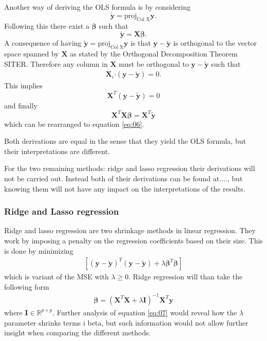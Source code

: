 \documentclass[uio,jmp,amsmath,amssymb,reprint]{revtex4-1}
\numberwithin{equation}{section}
\newcommand{\lp}{\left(}
\newcommand{\rp}{\right)}
\newcommand{\lsb}{\left[}
\newcommand{\rsb}{\right]}
\newcommand{\pdot}{\boldsymbol{\cdot}}
\begin{document}
Another way of deriving the OLS formula is by considering
\begin{equation}
    \bm{\tilde{y}} = \text{proj}_{\text{Col X}}\bm{y}.
\end{equation}
Following this there exist a \(\bm{\beta}\) such that
\begin{equation}
    \bm{\tilde{y}} = \bm{X}\bm{\beta}.
\end{equation}
A consequence of having \(\bm{\tilde{y}} = \text{proj}_{\text{Col X}}\bm{y}\) is that \(\bm{y} - \bm{\tilde{y}}\) is orthogonal to the vector space spanned by \(\bm{X}\) as stated by the Orthogonal Decomposition Theorem SITER. Therefore any column in \(\bm{X}\) must be orthogonal to \(\bm{y} - \bm{\tilde{y}}\) such that
\begin{align}
    \bm{X}_i\pdot (\bm{y} - \bm{\tilde{y}}) = 0.
\end{align}
This implies
\begin{equation}
    \bm{X}^T(\bm{y} - \bm{\tilde{y}}) = 0
\end{equation}
and finally
\begin{equation}
    \bm{X}^T\bm{X}\bm{\beta} = \bm{X}^T\bm{\tilde{y}} 
\end{equation}
which can be rearranged to equation \ref{eq:06}.

Both derivations are equal in the sense that they yield the OLS formula, but their interpretations are different.

For the two remaining methods: ridge and lasso regression their derivations will not be carried out. Instead both of their derivations can be found at...., but knowing them will not have any impact on the interpretations of the results.

\subsubsection{Ridge and Lasso regression}

Ridge and lasso regression are two shrinkage methods in linear regression. They work by imposing a penalty on the regression coefficients based on their size. This is done by minimizing
\begin{align}
    \lsb \lp \bm{y} - \bm{\tilde{y}}\rp^T\lp \bm{y} - \bm{\tilde{y}}\rp + \lambda \bm{\beta}^T\bm{\beta}\rsb
\end{align}
which is variant of the MSE with \(\lambda \geq 0\). Ridge regression will than take the following form
\begin{align}\label{eq:07}
    \bm{\beta} = (\bm{X}^T\bm{X} + \lambda\bm{I})^{-1}\bm{X}^T\bm{y}
\end{align}
where \(\bm{I} \in \mathbb{R}^{p\times p}\). Further analysis of equation \ref{eq:07} would reveal how the \(\lambda\) parameter shrinks terms i beta, but such information would not allow further insight when comparing the different methods.
\end{document}
